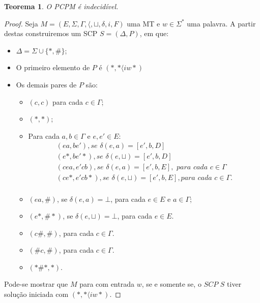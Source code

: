 \documentclass[a4paper]{article}
\newtheorem{Theorem}{Teorema}
\theoremstyle{definition}
\begin{document}
  \begin{Theorem}
    O PCPM é indecidível.
  \end{Theorem}
  \begin{proof}
    Seja $M = (E,\Sigma,\Gamma,\langle, \sqcup,\delta,i,F)$ uma MT e $w \in
    \Sigma^*$ uma palavra. A partir destas construiremos um SCP $S =
    (\Delta,P)$, em que:
    \begin{itemize}
      \item $\Delta = \Sigma \cup \{*,\#\}$;
      \item O primeiro elemento de $P$ é $(*,*\langle iw*)$
      \item Os demais pares de $P$ são:
        \begin{itemize}
          \item $(c,c)$ para cada $c \in \Gamma$;
          \item $(*,*)$;
          \item Para cada $a,b \in \Gamma$ e $e,e' \in E$:
            \[
              \begin{array}{l}
                (ea,be'), \textit{se }\delta(e,a) = [e',b,D]\\
                (e*,be'*), \textit{se }\delta(e,\sqcup) =[e',b,D]\\
                (cea,e'cb), \textit{se }\delta(e,a) = [e',b,E],\textit{ para
                cada }c\in\Gamma\\
                (ce*,e'cb*),\textit{se }\delta(e,\sqcup) = [e',b,E],\textit{
                para cada }c\in\Gamma.\\
              \end{array}
            \]
          \item $(ea,\#)$, se $\delta(e,a) = \bot$, para cada $e\in E$ e $a
            \in\Gamma$;
          \item $(e*,\#*)$, se $\delta(e,\sqcup) = \bot$, para cada $e\in E$.
          \item $(c\#,\#)$, para cada $c \in \Gamma$.
          \item $(\#c,\#)$, para cada $c \in\Gamma$.
          \item $(* \# *, *)$.
        \end{itemize}
      \end{itemize}
      Pode-se mostrar que $M$ para com entrada $w$, se e somente se, o $SCP$ $S$
      tiver solução iniciada com $(*,*\langle iw*)$.
    \end{proof}
\end{document}
